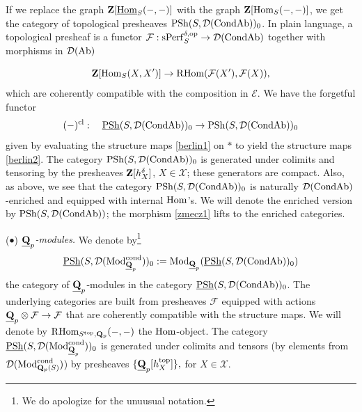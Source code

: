 \documentclass[10pt]{amsart}
\theoremstyle{definition}
\theoremstyle{remark}
\newcommand{\Hom}{{\rm{Hom}} }
\newcommand{\uHom}{\underline{{\rm{Hom}} }}
\newcommand{\sff}{{\mathcal{F}}}
\newcommand{\se}{{\mathcal{E}}}
\newcommand{\sx}{{\mathcal{X}}}
\newcommand{\sd}{{\mathcal{D}}}
\numberwithin{equation}{section}
\def\R{{\mathrm R}}
\def\Q{{\bf Q}} \def\Z{{\bf Z}}
\numberwithin{equation}{section}
\begin{document}
If we replace the graph $\Z[\uHom_S(-,-)]$ with the graph $\Z[\Hom_S(-,-)]$, we get the  category of topological presheaves ${\rm PSh}(S,\sd({\rm CondAb}))_0$. In plain language, a topological  presheaf is  a functor $\sff : {\rm sPerf}_S^{\delta, \rm op}\to \sd({\rm CondAb})$  together with  morphisms in $\sd({\rm Ab})$

\begin{equation}\label{berlin2}
\Z[\Hom_{S}(X, X^{\prime})] \to \R\Hom(\sff(X^{\prime}), \sff(X)),
\end{equation}
which are  coherently compatible with the composition in $\se$.
We have the forgetful functor
\begin{equation}\label{zmecz1}
(-)^{\rm cl} :\quad \underline{ {\rm PSh}}(S,\sd({\rm CondAb}))_0 \to {\rm PSh}(S,\sd({\rm CondAb}))_0
\end{equation}
given by evaluating the structure maps \eqref{berlin1} on $*$  to yield the structure maps \eqref{berlin2}. The category ${\rm PSh}(S,\sd({\rm CondAb}))_0$  is generated under colimits and tensoring by the presheaves $\Z[h^{\delta}_X]$, $X\in \sx$; these generators are compact. Also, as above, we see that the category 
${\rm PSh}(S,\sd({\rm CondAb}))_0$ is naturally  $\sd({\rm CondAb})$-enriched and equipped with internal $\Hom$'s. We will denote the enriched version by ${\rm PSh}(S,\sd({\rm CondAb}))$; the morphism \eqref{zmecz1} lifts to the enriched categories. 


\vskip2mm
   ($\bullet$) {\em $\underline{\Q}_p$-modules.}  We denote by\footnote{We do apologize for the unuusual notation.}
\begin{equation}\label{enr-kol2D}
\underline{\rm PSh}(S,\sd({\rm Mod}^{\rm cond}_{\underline{\Q}_p}))_0:={\rm Mod}_{\underline{\Q}_p}(\underline{\rm PSh}(S,\sd({\rm CondAb}))_0)
\end{equation}
 the category of  $\underline{\Q}_p$-modules in the category $\underline{\rm PSh}(S,\sd({\rm CondAb}))_0$.
 The underlying categories are built from presheaves $\sff$ equipped with  actions
 $
 \underline{\Q}_p\otimes \sff\to \sff
 $
 that are coherently compatible with the structure maps.   We will denote by  $\R\Hom_{S^{\rm top},\Q_p}(-,-)$ the $\Hom$-object.  The category $\underline{{\rm PSh}}(S, \sd({\rm Mod}^{\rm cond}_{\underline{\Q}_p}))_0$  is generated under colimits and tensors (by elements from $\sd({\rm Mod}^{\rm cond}_{\Q_p(S)})$) by presheaves 
$
\{\underline{\Q}_p[h^{\rm top}_X]\},
$
for  $ X\in \sx$.    

 
 
\end{document}

